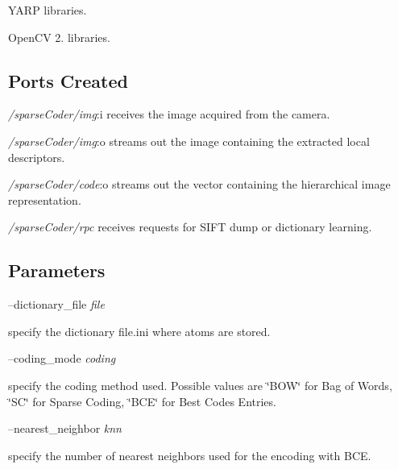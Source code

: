 \begin{DoxyItemize}
\item Y\+A\+R\+P libraries.
\item Open\+C\+V 2. libraries.
\end{DoxyItemize}\hypertarget{group__icub__sparseCoder_portsc_sec}{}\subsection{Ports Created}\label{group__icub__sparseCoder_portsc_sec}

\begin{DoxyItemize}
\item {\itshape /sparse\+Coder/img}\+:i receives the image acquired from the camera.
\item {\itshape /sparse\+Coder/img}\+:o streams out the image containing the extracted local descriptors.
\item {\itshape /sparse\+Coder/code}\+:o streams out the vector containing the hierarchical image representation.
\item {\itshape /sparse\+Coder/rpc} receives requests for S\+I\+F\+T dump or dictionary learning.
\end{DoxyItemize}\hypertarget{group__icub__sparseCoder_parameters_sec}{}\subsection{Parameters}\label{group__icub__sparseCoder_parameters_sec}
--dictionary\+\_\+file {\itshape file} 
\begin{DoxyItemize}
\item specify the dictionary file.\+ini where atoms are stored.
\end{DoxyItemize}

--coding\+\_\+mode {\itshape coding} 
\begin{DoxyItemize}
\item specify the coding method used. Possible values are \char`\"{}\+B\+O\+W\char`\"{} for Bag of Words, \char`\"{}\+S\+C\char`\"{} for Sparse Coding, \char`\"{}\+B\+C\+E\char`\"{} for Best Codes Entries.
\end{DoxyItemize}

--nearest\+\_\+neighbor {\itshape knn} 
\begin{DoxyItemize}
\item specify the number of nearest neighbors used for the encoding with B\+C\+E.
\end{DoxyItemize}

